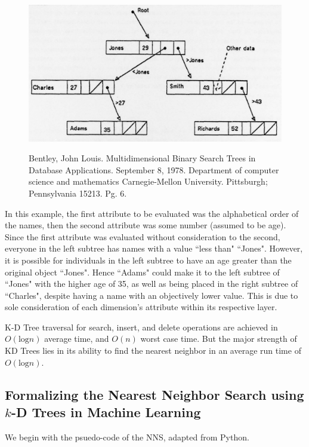 \documentclass{article}
\begin{document}
\begin{figure}[h]
    \centering
    \includegraphics[width=\textwidth,keepaspectratio]{Images/kd_tree.png}
    \label{fig:kd_tree}
    \caption{Bentley, John Louis. Multidimensional Binary Search Trees in Database Applications. September 8, 1978. Department of computer science and mathematics Carnegie-Mellon University. Pittsburgh; Pennsylvania 15213. Pg. 6.}
\end{figure}


In this example, the first attribute to be evaluated was the alphabetical order of the names, then the second attribute was some number (assumed to be age). Since the first attribute was evaluated without consideration to the second, everyone in the left subtree has names with a value ``less than" ``Jones". However, it is possible for individuals in the left subtree to have an age greater than the original object ``Jones". Hence ``Adams" could make it to the left subtree of ``Jones" with the higher age of 35, as well as being placed in the right subtree of ``Charles", despite having a name with an objectively lower value. This is due to sole consideration of each dimension’s attribute within its respective layer.

K-D Tree traversal for search, insert, and delete operations are achieved in $O(\text{log} n)$ average time, and $O(n)$ worst case time. But the major strength of KD Trees lies in its ability to find the nearest neighbor in an average run time of $O(\text{log} n)$.


        \subsection*{Formalizing the Nearest Neighbor Search using $k$-D Trees in Machine Learning}

            We begin with the psuedo-code of the NNS, adapted from Python\cite{CMUSlides}.
\end{document}
